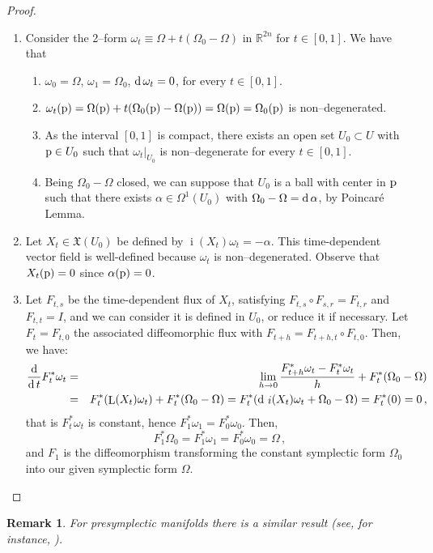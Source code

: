 \documentclass[12pt]{report}
\newtheorem{remark}[teor]{Remark}
\def\qed{\ifvmode\removelastskip\fi
{\unskip\nobreak\hfil\penalty50\hbox{}\nobreak\hfil
\hbox{\vrule height1.2ex width1.2ex}\parfillskip=0pt
\finalhyphendemerits=0 \par\smallskip}}
\def\vf{\mathfrak X}
\def\d{{\rm d}}
\def\Real{\mathbb{R}}
\def\Lie{\mathop{\rm L}\nolimits}
\def\inn{\mathop{i}\nolimits}
\begin{document}
\begin{proof}
\begin{enumerate}
\item Consider the 2--form $\omega_{t}\equiv\Omega+t(\Omega_{0}-\Omega)$ in $\Real^{2n}$ for $t\in[0,1]$. We have that
\begin{enumerate}
\item $\omega_{0}=\Omega$, $\omega_{1}=\Omega_{0}$, $\d\,\omega_{t}=0$, for every $t\in[0,1]$.
\item $\omega_{t}({\rm p})=\Omega({\rm p})+t(\Omega_{0}({\rm p})-\Omega({\rm p}))=\Omega({\rm p})=\Omega_{0}({\rm p})$ is non--degenerated.
\item As the interval $[0,1]$ is compact, there exists an open set $U_{0}\subset U$  with ${\rm p}\in U_{0}$ such that $\left.\omega_{t}\right|_{U_{0}}$ is non--degenerate for every $t\in[0,1]$.
\item Being $\Omega_{0}-\Omega$ closed,  we can suppose that $U_{0}$ is a ball with center in ${\rm p}$ such that there exists $\alpha\in\Omega^{1}(U_{0})$ with $\Omega_{0}-\Omega=\d\,\alpha$, by Poincar\'e Lemma.
\end{enumerate}
\item Let $X_{t}\in\vf(U_{0})$ be defined by $\inn (X_t)\omega_t=-\alpha$. This time-dependent vector field is well-defined because $\omega_t$ is non--degenerated. Observe that $X_t({\rm p})=0$ since  $\alpha({\rm p})=0$.
\item Let $F_{t,s}$ be the time-dependent flux of $X_{t}$, satisfying $F_{t,s}\circ F_{s,r}=F_{t,r}$ and $F_{t,t}=I$, and we can consider it is defined in $U_{0}$, or reduce it if necessary. Let $F_{t}=F_{t,0}$ the associated diffeomorphic flux with $F_{t+h}=F_{t+h,t}\circ F_{t,0}$. Then, we have:
\begin{eqnarray*}
\frac{\d}{\d\, t}F_{t}^{*}\omega_{t} &=& 
\lim_{h\to 0}\frac{F_{t+h}^{*}\omega_{t}  -F_{t}^{*}\omega_{t}}{h}+F_{t}^{*}(\Omega_{0}-\Omega)\\
&=&F_{t}^{*}( \Lie(X_{t})\omega_{t} )+F_{t}^{*}(\Omega_{0}-\Omega)
=F_{t}^{*}(\d\, \inn (X_t)\omega_t +\Omega_{0}-\Omega)
=F_{t}^{*}(0)=0\,,
\end{eqnarray*}
that is $F_{t}^{*}\omega_{t}$ is constant, hence $F_{1}^{*}\omega_{1}=F_{0}^{*}\omega_{0}$. Then,
$$
F_{1}^{*}\Omega_{0}=F_{1}^{*}\omega_{1}=F_{0}^{*}\omega_{0}=\Omega\, ,
$$
and $F_{1}$ is the diffeomorphism transforming the constant symplectic form $\Omega_{0}$ into 
our given symplectic form 
$\Omega$.
\end{enumerate}
\qed  \end{proof}

\begin{remark}{\rm 
For presymplectic manifolds there is a similar result (see, for instance, \cite{CP-adg,dLGRR-2023}).
}\end{remark}
\end{document}
